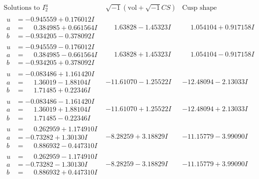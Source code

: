 \documentclass[1p]{elsarticle_modified}
\theoremstyle{definition}
\newcommand{\I}{\sqrt{-1}}
\begin{document}
$$\begin{array}{c|c|c}  
\text{Solutions to }I^u_{2}& \I (\text{vol} + \sqrt{-1}CS) & \text{Cusp shape}\\
 \hline 
\begin{aligned}
u &= -0.945559 + 0.176012 I \\
a &= \phantom{-}0.384985 + 0.661564 I \\
b &= -0.934205 - 0.378092 I\end{aligned}
 & \phantom{-}1.63828 - 1.45323 I & \phantom{-}1.054104 + 0.917158 I \\ \hline\begin{aligned}
u &= -0.945559 - 0.176012 I \\
a &= \phantom{-}0.384985 - 0.661564 I \\
b &= -0.934205 + 0.378092 I\end{aligned}
 & \phantom{-}1.63828 + 1.45323 I & \phantom{-}1.054104 - 0.917158 I \\ \hline\begin{aligned}
u &= -0.083486 + 1.161420 I \\
a &= \phantom{-}1.36019 - 1.88104 I \\
b &= \phantom{-}1.71485 + 0.22346 I\end{aligned}
 & -11.61070 - 1.25522 I & -12.48094 - 2.13033 I \\ \hline\begin{aligned}
u &= -0.083486 - 1.161420 I \\
a &= \phantom{-}1.36019 + 1.88104 I \\
b &= \phantom{-}1.71485 - 0.22346 I\end{aligned}
 & -11.61070 + 1.25522 I & -12.48094 + 2.13033 I \\ \hline\begin{aligned}
u &= \phantom{-}0.262959 + 1.174910 I \\
a &= -0.73282 + 1.30130 I \\
b &= \phantom{-}0.886932 - 0.447310 I\end{aligned}
 & -8.28259 + 3.18829 I & -11.15779 - 3.99090 I \\ \hline\begin{aligned}
u &= \phantom{-}0.262959 - 1.174910 I \\
a &= -0.73282 - 1.30130 I \\
b &= \phantom{-}0.886932 + 0.447310 I\end{aligned}
 & -8.28259 - 3.18829 I & -11.15779 + 3.99090 I \\ \hline\begin{aligned}

\end{aligned}
\end{array}$$
\end{document}
